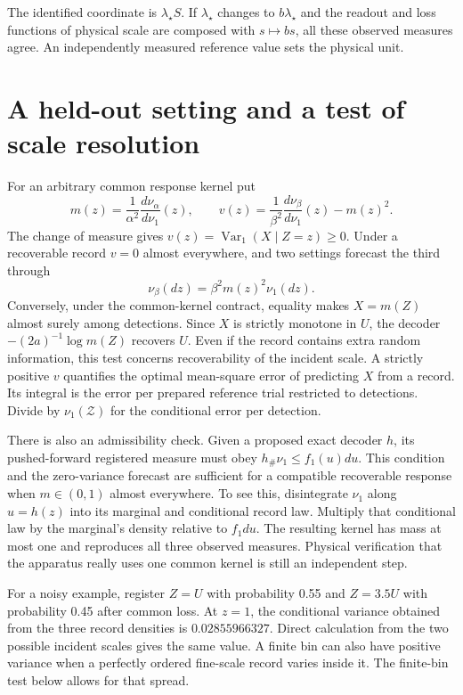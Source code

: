 The identified coordinate is $\lambda_\star S$. If $\lambda_\star$ changes to $b\lambda_\star$ and the readout and loss functions of physical scale are composed with $s\mapsto bs$, all these observed measures agree. An independently measured reference value sets the physical unit.

\section{A held-out setting and a test of scale resolution}
For an arbitrary common response kernel put
\[
 m(z)=\frac1{\alpha^2}\frac{d\nu_\alpha}{d\nu_1}(z),\qquad
 v(z)=\frac1{\beta^2}\frac{d\nu_\beta}{d\nu_1}(z)-m(z)^2.
\]
The change of measure gives $v(z)=\operatorname{Var}_1(X\mid Z=z)\ge0$. Under a recoverable record $v=0$ almost everywhere, and two settings forecast the third through
\[
 \nu_\beta(dz)=\beta^2 m(z)^2\nu_1(dz).
\]
Conversely, under the common-kernel contract, equality makes $X=m(Z)$ almost surely among detections. Since $X$ is strictly monotone in $U$, the decoder $-(2a)^{-1}\log m(Z)$ recovers $U$. Even if the record contains extra random information, this test concerns recoverability of the incident scale. A strictly positive $v$ quantifies the optimal mean-square error of predicting $X$ from a record. Its integral is the error per prepared reference trial restricted to detections. Divide by $\nu_1(\mathcal Z)$ for the conditional error per detection.

There is also an admissibility check. Given a proposed exact decoder $h$, its pushed-forward registered measure must obey $h_\#\nu_1\le f_1(u)du$. This condition and the zero-variance forecast are sufficient for a compatible recoverable response when $m\in(0,1)$ almost everywhere. To see this, disintegrate $\nu_1$ along $u=h(z)$ into its marginal and conditional record law. Multiply that conditional law by the marginal's density relative to $f_1 du$. The resulting kernel has mass at most one and reproduces all three observed measures. Physical verification that the apparatus really uses one common kernel is still an independent step.

For a noisy example, register $Z=U$ with probability 0.55 and $Z=3.5U$ with probability 0.45 after common loss. At $z=1$, the conditional variance obtained from the three record densities is $0.02855966327$. Direct calculation from the two possible incident scales gives the same value. A finite bin can also have positive variance when a perfectly ordered fine-scale record varies inside it. The finite-bin test below allows for that spread.

